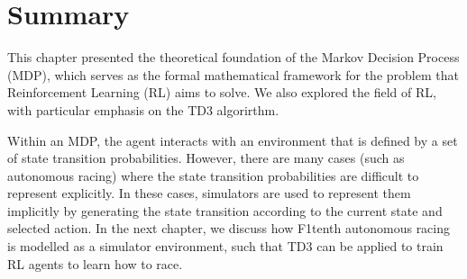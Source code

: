 \section{Summary}

This chapter presented the theoretical foundation of the Markov Decision Process (MDP), which serves as the formal mathematical framework for the problem that Reinforcement Learning (RL) aims to solve.
We also explored the field of RL, with particular emphasis on the TD3 algorirthm.
 

Within an MDP, the agent interacts with an environment that is defined by a set of state transition probabilities. 
However, there are many cases (such as autonomous racing) where the state transition probabilities are difficult to represent explicitly.
In these cases, simulators are used to represent them implicitly by generating the state transition according to the current state and selected action.
In the next chapter, we discuss how F1tenth autonomous racing is modelled as a simulator environment, 
such that TD3 can be applied to train RL agents to learn how to race.



